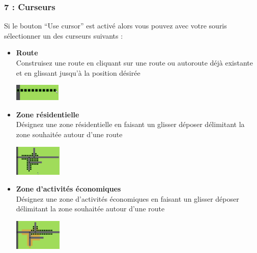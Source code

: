 \documentclass[11pt]{report}
\begin{document}
\subsubsection{7 : Curseurs}
Si le bouton ``Use cursor'' est activé alors vous pouvez avec votre souris sélectionner un des curseurs suivants :\\
\begin{itemize}
	\item
	\begin{minipage}{0.75\textwidth}
		\textbf{Route}\\
		Construisez une route en cliquant sur une route ou autoroute déjà existante et en glissant jusqu'à la position désirée
	\end{minipage}
	\begin{minipage}{0.2\textwidth}
		\begin{flushright}
			\includegraphics[height=30px]{planners_road}
		\end{flushright}
	\end{minipage}
	
	\item
	\begin{minipage}{0.75\textwidth}
		\textbf{Zone résidentielle}\\
		Désignez une zone résidentielle en faisant un glisser déposer délimitant la zone souhaitée autour d'une route
	\end{minipage}
	\begin{minipage}{0.2\textwidth}
		\begin{flushright}
			\includegraphics[height=55px]{planners_house_zone}
		\end{flushright}
	\end{minipage}
	
	\item
	\begin{minipage}{0.75\textwidth}
		\textbf{Zone d'activités économiques}\\
		Désignez une zone d'activités économiques en faisant un glisser déposer délimitant la zone souhaitée autour d'une route
	\end{minipage}
	\begin{minipage}{0.2\textwidth}
		\begin{flushright}
			\includegraphics[height=55px]{planners_business_zone}
		\end{flushright}
	\end{minipage}
	

\end{itemize}
\end{document}
